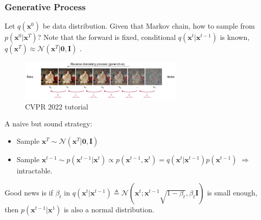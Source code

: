 \documentclass[10pt,xcolor={usenames,dvipsnames,table}]{beamer}
\begin{document}
\begin{frame}
    \frametitle{Generative Process}
    Let $q(\bm{x}^{0})$ be data distribution. Given that Markov chain, how to sample from $p(\bm{x}^{0} | \bm{x}^{T})$? Note that the forward is fixed, conditional $q(\bm{x}^{t}| \bm{x}^{t-1})$ is known, $q(\bm{x}^{T}) \approx \mathcal{N}(\bm{x}^{T}| \bm{0}, \bm{I})$ .
    \begin{figure}
        \centering
        \includegraphics[width=0.7\textwidth]{images/backward.png}
        \caption{CVPR 2022 tutorial}
    \end{figure}

    A naive but sound strategy:
    \begin{itemize}
        \item Sample $\bm{x}^{T} \sim \mathcal{N}(\bm{x}^{T}| \bm{0}, \bm{I})$
        \item Sample $\bm{x}^{t-1} \sim p(\bm{x}^{t-1}| \bm{x}^{t}) \propto p(\bm{x}^{t-1}, \bm{x}^{t}) = q(\bm{x}^t | \bm{x}^{t-1}) p(\bm{x}^{t-1}) $ $\Rightarrow$ intractable. 

    \end{itemize}
        Good news is if $\beta_t$ in 
        $ q(\bm{x}^{t}|\bm{x}^{t-1}) \triangleq \mathcal{N}(\bm{x}^{t}; \bm{x}^{t-1}\sqrt{1-\beta_t}, \beta_t \bm{I})$ 
        is small enough, then 
        $p(\bm{x}^{t-1}| \bm{x}^{1})$ is also a normal distribution.
\end{frame}
\end{document}
